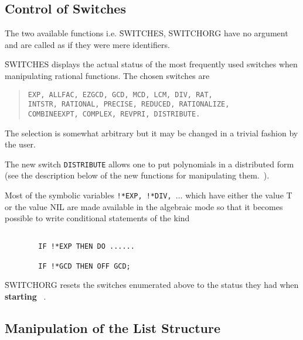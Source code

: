 \subsection{Control of Switches}
The two available functions i.e. \f{SWITCHES, SWITCHORG} have
no argument and are called as if they were mere identifiers.

\f{SWITCHES} displays the actual status of the most frequently used switches
when manipulating rational functions. The chosen switches are
\begin{quotation}
\noindent
{\tt EXP, ALLFAC, EZGCD, GCD, MCD, LCM, DIV, RAT, \\%
INTSTR, RATIONAL, PRECISE, REDUCED, RATIONALIZE, \\%
COMBINEEXPT, COMPLEX, REVPRI, DISTRIBUTE.}
\end{quotation}

The selection is somewhat arbitrary but it may be changed in a trivial
fashion by the user.

The new switch {\tt DISTRIBUTE} allows one to put polynomials in a
distributed form (see the description below of
the new functions for manipulating  them.~).

Most of the symbolic variables {\tt !*EXP, !*DIV, $\ldots$}
which have either the value T or the value NIL are made available in the
algebraic mode so that it becomes possible to write conditional
statements of the kind
\begin{verbatim}

        IF !*EXP THEN DO ......

        IF !*GCD THEN OFF GCD;

\end{verbatim}
\f{SWITCHORG} resets  the switches enumerated above to the status
they had when {\bf starting} \REDUCE\ .
\subsection{Manipulation of the List Structure}

